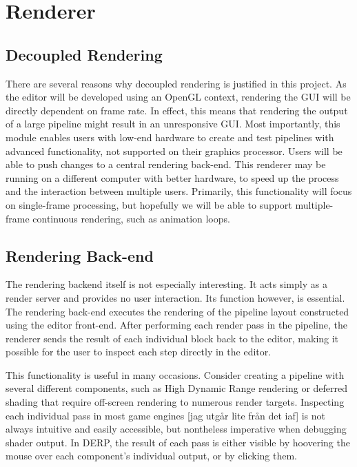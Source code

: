 
\chapter{Renderer}

\section{Decoupled Rendering}
There are several reasons why decoupled rendering is justified in this project. As the editor will be developed using an OpenGL context, rendering the GUI will be directly dependent on frame rate. In effect, this means that rendering the output of a large pipeline might result in an unresponsive GUI.
Most importantly, this module enables users with low-end hardware to create and test pipelines with advanced functionality, not supported on their graphics processor. Users will be able to push changes to a central rendering back-end. This renderer may be running on a different computer with better hardware, to speed up the process and the interaction between multiple users.  Primarily, this functionality will focus on single-frame processing, but hopefully we will be able to support multiple-frame continuous rendering, such as animation loops. 

\section{Rendering Back-end}
The rendering backend itself is not especially interesting. It acts simply as a render server and provides no user interaction. Its function however, is essential. The rendering back-end executes the rendering of the pipeline layout constructed using the editor front-end. After performing each render pass in the pipeline, the renderer sends the result of each individual block back to the editor, making it possible for the user to inspect each step directly in the editor. 

This functionality is useful in many occasions. Consider creating a pipeline with several different components, such as High Dynamic Range rendering or deferred shading that require off-screen rendering to numerous render targets. Inspecting each individual pass in most game engines [jag utgår lite från det iaf] is not always intuitive and easily accessible, but nontheless imperative when debugging shader output. In DERP, the result of each pass is either visible by hoovering the mouse over each component's individual output, or by clicking them. 